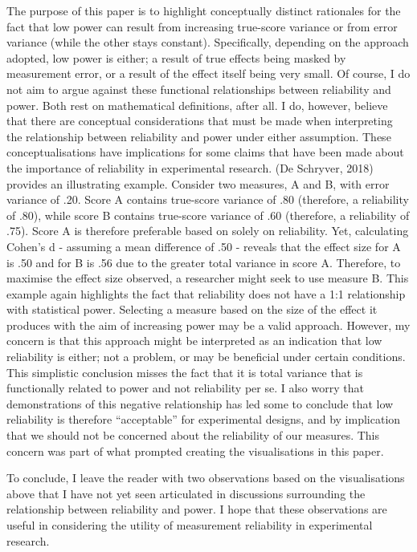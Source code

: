 \documentclass[english,,man]{apa6}
\begin{document}
The purpose of this paper is to highlight conceptually distinct rationales for the fact that low power can result from increasing true-score variance or from error variance (while the other stays constant). Specifically, depending on the approach adopted, low power is either; a result of true effects being masked by measurement error, or a result of the effect itself being very small. Of course, I do not aim to argue against these functional relationships between reliability and power. Both rest on mathematical definitions, after all. I do, however, believe that there are conceptual considerations that must be made when interpreting the relationship between reliability and power under either assumption. These conceptualisations have implications for some claims that have been made about the importance of reliability in experimental research. (De Schryver, 2018) provides an illustrating example. Consider two measures, A and B, with error variance of .20. Score A contains true-score variance of .80 (therefore, a reliability of .80), while score B contains true-score variance of .60 (therefore, a reliability of .75). Score A is therefore preferable based on solely on reliability. Yet, calculating Cohen's d - assuming a mean difference of .50 - reveals that the effect size for A is .50 and for B is .56 due to the greater total variance in score A. Therefore, to maximise the effect size observed, a researcher might seek to use measure B. This example again highlights the fact that reliability does not have a 1:1 relationship with statistical power. Selecting a measure based on the size of the effect it produces with the aim of increasing power may be a valid approach. However, my concern is that this approach might be interpreted as an indication that low reliability is either; not a problem, or may be beneficial under certain conditions. This simplistic conclusion misses the fact that it is total variance that is functionally related to power and not reliability per se. I also worry that demonstrations of this negative relationship has led some to conclude that low reliability is therefore \enquote{acceptable} for experimental designs, and by implication that we should not be concerned about the reliability of our measures. This concern was part of what prompted creating the visualisations in this paper.

To conclude, I leave the reader with two observations based on the visualisations above that I have not yet seen articulated in discussions surrounding the relationship between reliability and power. I hope that these observations are useful in considering the utility of measurement reliability in experimental research.
\end{document}
